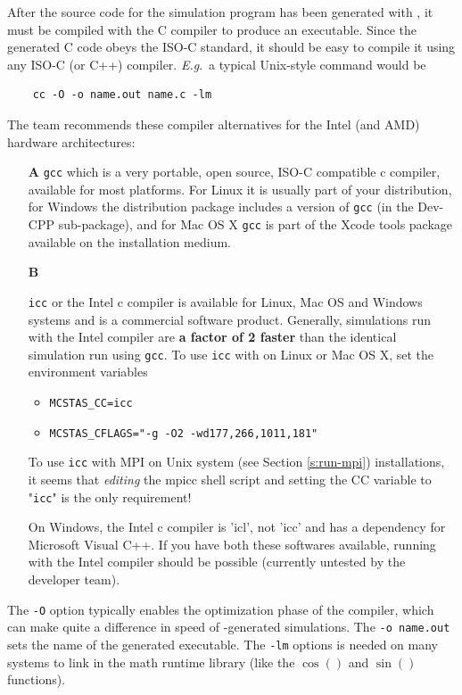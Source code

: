 After the source code for the simulation program has been generated with \mcs,
it must be compiled with the C compiler to produce an executable.
Since the generated C code obeys the ISO-C standard, it should be easy
to compile it using any ISO-C (or C++) compiler. \textit{E.g}.\ a typical
Unix-style command would be
\begin{lstlisting}
    cc -O -o name.out name.c -lm
\end{lstlisting}
The \MCS team recommends these compiler alternatives for the Intel (and AMD)
hardware architectures:
\begin{itemize}
\item[\textbf{A}]{\verb+gcc+ which is a very portable, open source, ISO-C compatible
    c compiler, available for most platforms. For Linux it is usually part of
    your distribution, for Windows the \MCS distribution package includes a
    version of \verb+gcc+ (in the Dev-CPP sub-package), and for Mac OS X
    \verb+gcc+ is part of the Xcode tools package available on the installation
    medium.}
\item[\textbf{B}]{\verb+icc+ or the Intel c compiler is available for Linux, Mac OS
    and Windows systems and is a commercial software product. Generally,
    simulations run with the Intel compiler are \textbf{a factor of 2 faster} than
    the identical simulation run using \verb+gcc+. To use \verb+icc+ with \MCS
    on Linux or Mac OS X, set the environment variables
    \begin{itemize}
      \item{\verb+MCSTAS_CC=icc+}
      \item{\verb+MCSTAS_CFLAGS="-g -O2 -wd177,266,1011,181"+}
    \end{itemize}
    To use \verb+icc+ with MPI on Unix system (see Section \ref{s:run-mpi})
 installations, it seems that \emph{editing}
    the mpicc shell script and setting the CC variable to "\verb+icc+" is the
    only requirement!}
  On Windows, the Intel c compiler is 'icl', not 'icc' and has a dependency for
  Microsoft Visual C++. If you have both these softwares available, running
  \MCS with the Intel compiler should be possible (currently untested by the
  \MCS developer team).

\end{itemize}


The \verb+-O+ option typically enables the optimization phase of the compiler,
which can make quite a difference in speed of \mcs-generated simulations. The
\verb+-o name.out+ sets the name of the generated executable. The \verb+-lm+
options is needed on many systems to link in the math runtime library (like the
$\cos()$ and $\sin()$ functions). 

